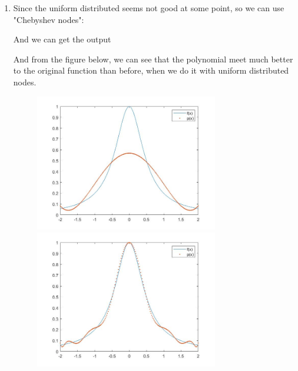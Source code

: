 \documentclass{article}
\begin{document}
\begin{enumerate}
\begin{enumerate}
  \item  
  Since the uniform distributed seems not good at some point, so we can use "Chebyshev nodes":
   
   And we can get the output
     
     
     And from the figure below, we can see that the polynomial meet much better to the original function than before, when we do it with uniform distributed nodes.
     
     \begin{figure}[ht]
        \includegraphics[width=8cm]{chebyshev6.jpg}
        \includegraphics[width=8cm]{chebyshev13.jpg}
     \end{figure}
\end{enumerate}

\end{enumerate}
\end{document}
